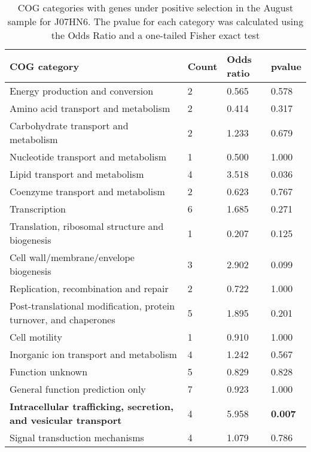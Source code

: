 \begin{table}[hb]
\footnotesize 
	\tabcolsep=0.11cm 
\caption{COG categories with genes under positive selection in the August sample for J07HN6. The pvalue for each category was calculated using the Odds Ratio and a one-tailed Fisher exact test \\} 
\begin{tabularx}{\textwidth}{L{6cm}R{2cm}R{2cm}R{2cm}} 
\hline 
\textbf{COG category} & \textbf{Count} & \textbf{Odds ratio} & \textbf{pvalue} \\ 
\hline 
Energy production and conversion & 2 & 0.565 & 0.578 \\ 
Amino acid transport and metabolism & 2 & 0.414 & 0.317 \\ 
Carbohydrate transport and metabolism & 2 & 1.233 & 0.679 \\ 
Nucleotide transport and metabolism & 1 & 0.500 & 1.000 \\ 
Lipid transport and metabolism & 4 & 3.518 & 0.036 \\ 
Coenzyme transport and metabolism & 2 & 0.623 & 0.767 \\ 
Transcription & 6 & 1.685 & 0.271 \\ 
Translation, ribosomal structure and biogenesis & 1 & 0.207 & 0.125 \\ 
Cell wall/membrane/envelope biogenesis & 3 & 2.902 & 0.099 \\ 
Replication, recombination and repair & 2 & 0.722 & 1.000 \\ 
Post-translational modification, protein turnover, and chaperones & 5 & 1.895 & 0.201 \\ 
Cell motility & 1 & 0.910 & 1.000 \\ 
Inorganic ion transport and metabolism & 4 & 1.242 & 0.567 \\ 
Function unknown & 5 & 0.829 & 0.828 \\ 
General function prediction only & 7 & 0.923 & 1.000 \\ 
\textbf{Intracellular trafficking, secretion, and vesicular transport} & 4 & 5.958 & \textbf{0.007} \\ 
Signal transduction mechanisms & 4 & 1.079 & 0.786 \\ 
\end{tabularx} 
\label{August_COG_Selection_J07HN6} 
 \end{table} 

